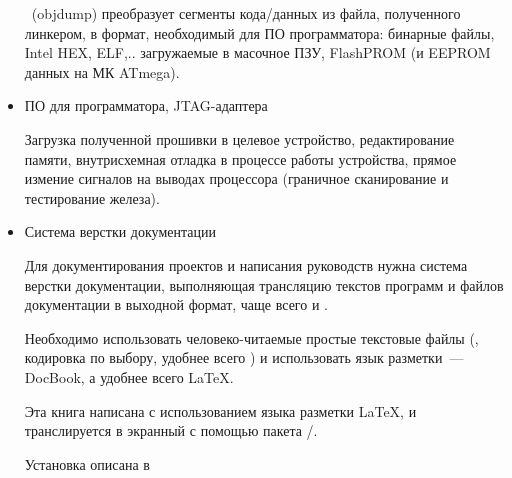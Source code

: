 \begin{itemize}
  \ (objdump) преобразует сегменты кода/данных из файла,
  полученного линкером, в формат, необходимый для ПО программатора: бинарные файлы, Intel
  HEX, ELF,.. загружаемые в масочное ПЗУ, FlashPROM (и EEPROM данных на МК
  ATmega).
  
  \item ПО для программатора, JTAG-адаптера
  
  Загрузка полученной прошивки в целевое устройство, редактирование памяти, 
  внутрисхемная отладка в процессе работы устройства, прямое измение сигналов на
  выводах процессора (граничное сканирование и тестирование железа).
  
  \item Система верстки документации
  
  Для документирования проектов и написания руководств нужна система верстки
  документации, выполняющая трансляцию текстов программ и файлов 
  документации в выходной формат, чаще всего  и .
  
  Необходимо использовать человеко-читаемые простые текстовые файлы 
  (, кодировка по выбору, удобнее всего ) и
  использовать язык разметки\ --- DocBook, а удобнее всего \LaTeX.
  
  
  Эта книга написана с использованием языка разметки \LaTeX, и транслируется
  в экранный  с помощью пакета /.
  
  Установка описана в 
  
\end{itemize}

